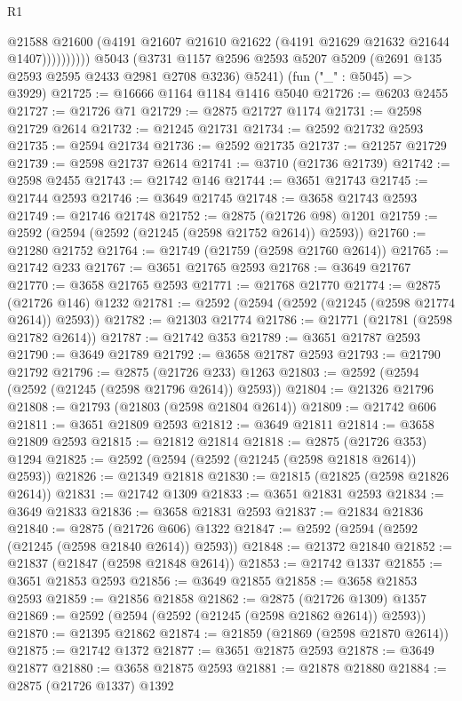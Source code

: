 \begin{lexlean}{R1}
\begin{coremodule}
                    @21588
                    @21600
                    (@4191 @21607 @21610 @21622 (@4191 @21629 @21632 @21644 @1407))))))))))
    @5043
    (@3731 @1157 @2596 @2593 @5207 @5209 (@2691 @135 @2593 @2595 @2433 @2981 @2708 @3236) @5241)
    (fun ("_" : @5045) => @3929)
@21725 := @16666 @1164 @1184 @1416 @5040
@21726 := @6203 @2455
@21727 := @21726 @71
@21729 := @2875 @21727 @1174
@21731 := @2598 @21729 @2614
@21732 := @21245 @21731
@21734 := @2592 @21732 @2593
@21735 := @2594 @21734
@21736 := @2592 @21735
@21737 := @21257 @21729
@21739 := @2598 @21737 @2614
@21741 := @3710 (@21736 @21739)
@21742 := @2598 @2455
@21743 := @21742 @146
@21744 := @3651 @21743
@21745 := @21744 @2593
@21746 := @3649 @21745
@21748 := @3658 @21743 @2593
@21749 := @21746 @21748
@21752 := @2875 (@21726 @98) @1201
@21759 := @2592 (@2594 (@2592 (@21245 (@2598 @21752 @2614)) @2593))
@21760 := @21280 @21752
@21764 := @21749 (@21759 (@2598 @21760 @2614))
@21765 := @21742 @233
@21767 := @3651 @21765 @2593
@21768 := @3649 @21767
@21770 := @3658 @21765 @2593
@21771 := @21768 @21770
@21774 := @2875 (@21726 @146) @1232
@21781 := @2592 (@2594 (@2592 (@21245 (@2598 @21774 @2614)) @2593))
@21782 := @21303 @21774
@21786 := @21771 (@21781 (@2598 @21782 @2614))
@21787 := @21742 @353
@21789 := @3651 @21787 @2593
@21790 := @3649 @21789
@21792 := @3658 @21787 @2593
@21793 := @21790 @21792
@21796 := @2875 (@21726 @233) @1263
@21803 := @2592 (@2594 (@2592 (@21245 (@2598 @21796 @2614)) @2593))
@21804 := @21326 @21796
@21808 := @21793 (@21803 (@2598 @21804 @2614))
@21809 := @21742 @606
@21811 := @3651 @21809 @2593
@21812 := @3649 @21811
@21814 := @3658 @21809 @2593
@21815 := @21812 @21814
@21818 := @2875 (@21726 @353) @1294
@21825 := @2592 (@2594 (@2592 (@21245 (@2598 @21818 @2614)) @2593))
@21826 := @21349 @21818
@21830 := @21815 (@21825 (@2598 @21826 @2614))
@21831 := @21742 @1309
@21833 := @3651 @21831 @2593
@21834 := @3649 @21833
@21836 := @3658 @21831 @2593
@21837 := @21834 @21836
@21840 := @2875 (@21726 @606) @1322
@21847 := @2592 (@2594 (@2592 (@21245 (@2598 @21840 @2614)) @2593))
@21848 := @21372 @21840
@21852 := @21837 (@21847 (@2598 @21848 @2614))
@21853 := @21742 @1337
@21855 := @3651 @21853 @2593
@21856 := @3649 @21855
@21858 := @3658 @21853 @2593
@21859 := @21856 @21858
@21862 := @2875 (@21726 @1309) @1357
@21869 := @2592 (@2594 (@2592 (@21245 (@2598 @21862 @2614)) @2593))
@21870 := @21395 @21862
@21874 := @21859 (@21869 (@2598 @21870 @2614))
@21875 := @21742 @1372
@21877 := @3651 @21875 @2593
@21878 := @3649 @21877
@21880 := @3658 @21875 @2593
@21881 := @21878 @21880
@21884 := @2875 (@21726 @1337) @1392

\end{coremodule}
\end{lexlean}
